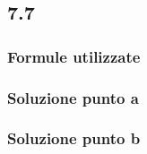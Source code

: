 \documentclass[../../main.tex]{subfiles}
\begin{document}
\subsection*{7.7}
\subsubsection*{Formule utilizzate}
\subsubsection*{Soluzione punto a}
\subsubsection*{Soluzione punto b}
\newpage
\end{document}
